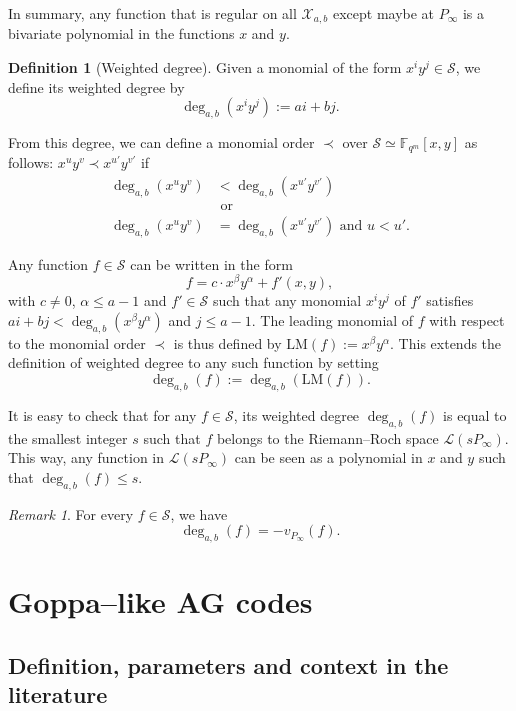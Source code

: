 \documentclass[journal]{IEEEtran}
\theoremstyle{plain}
\theoremstyle{definition}
\newtheorem{definition}[thm]{Definition}
\theoremstyle{remark}
\newtheorem{remark}[thm]{Remark}
\newcommand{\calL}{\mathcal{L}}
\newcommand{\calS}{\mathcal{S}}
\newcommand{\calX}{\mathcal{X}}
\newcommand{\fqm}{\mathbb{F}_{q^m}}
\newcommand{\degab}[1]{\deg_{a,b}\left(#1\right)}
\begin{document}
	In summary, any function that is regular on all $\calX_{a,b}$ except maybe at $P_\infty$ is a bivariate polynomial in the functions $x$ and $y$. 
	
	\begin{definition}[Weighted degree] 
		Given a monomial of the form $x^iy^j \in \calS$, we define its weighted degree by
		\[ \degab{x^iy^j} := ai+bj.\]
		
		From this degree, we can define a monomial order $\prec$ over $\calS \simeq \fqm[x,y]$ as follows: $x^uy^v \prec x^{u'}y^{v'}$ if
		\begin{equation}\label{eq:def_mon_order}
			\begin{aligned}			
			\degab{x^uy^v} &< \degab{x^{u'}y^{v'}} \\
			&\text{ or }\\
			 \degab{x^uy^v} &= \degab{x^{u'}y^{v'}}  \text{ and } u < u'.
			 \end{aligned}
		\end{equation}
		
		Any function $f \in \calS$ can be written in the form $$f = c \cdot x^{\beta}y^{\alpha} + f'(x,y),$$
		with $c \neq 0$, $\alpha \leq a-1$ and $f' \in \calS$ such that any monomial $x^iy^j$ of $f'$ satisfies $ai+bj < \degab{x^{\beta}y^{\alpha}}$ and $j \leq a-1$. The leading monomial of $f$ with respect to the monomial order $\prec$ is thus defined by $\mathrm{LM}(f) := x^{\beta}y^{\alpha}$. This extends the definition of weighted degree to any such function by setting 
		\[\degab{f} := \degab{\mathrm{LM}(f)}.\]
	\end{definition}
	
	It is easy to check that for any $f \in \calS$, its weighted degree $\degab{f}$ is equal to the smallest integer $s$ such that $f$ belongs to the Riemann--Roch space $\calL(sP_{\infty})$.
	This way, any function in $\calL(sP_\infty)$ can be seen as a polynomial in $x$ and $y$ such that $\degab{f}\leq s$. 
	\begin{remark} \label{rq:link_degab_valuation}
		For every $f \in \calS$, we have 
\[		\degab{f}=-v_{P_\infty}(f).\]
	\end{remark}
	
	\section{Goppa--like AG codes}\label{sec:Goppa}
	\subsection{Definition, parameters and context in the literature}\label{subsec:def-Goppa}
	
\end{document}
